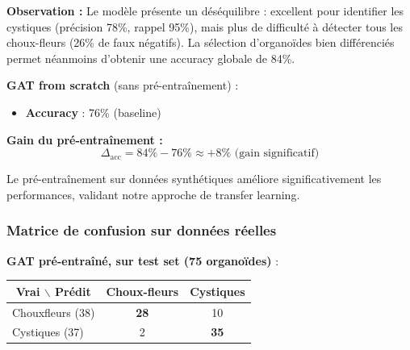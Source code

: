 \textbf{Observation :} Le modèle présente un déséquilibre : excellent pour identifier les cystiques (précision 78\%, rappel 95\%), mais plus de difficulté à détecter tous les choux-fleurs (26\% de faux négatifs). La sélection d'organoïdes bien différenciés permet néanmoins d'obtenir une accuracy globale de 84\%.

\textbf{GAT from scratch} (sans pré-entraînement) :
\begin{itemize}
    \item \textbf{Accuracy} : 76\% (baseline)
\end{itemize}

\textbf{Gain du pré-entraînement :}
\[
\Delta_{\text{acc}} = 84\% - 76\% \approx +8\% \text{ (gain significatif)}
\]

Le pré-entraînement sur données synthétiques améliore significativement les performances, validant notre approche de transfer learning.

\subsubsection{Matrice de confusion sur données réelles}

\textbf{GAT pré-entraîné, sur test set (75 organoïdes)} :

\begin{center}
\begin{tabular}{|l|cc|}
\hline
\multicolumn{1}{|c|}{\textbf{Vrai $\backslash$ Prédit}} & \textbf{Choux-fleurs} & \textbf{Cystiques} \\
\hline
Chouxfleurs (38) & \textbf{28} & 10 \\
Cystiques (37) & 2 & \textbf{35} \\
\hline
\end{tabular}
\end{center}

